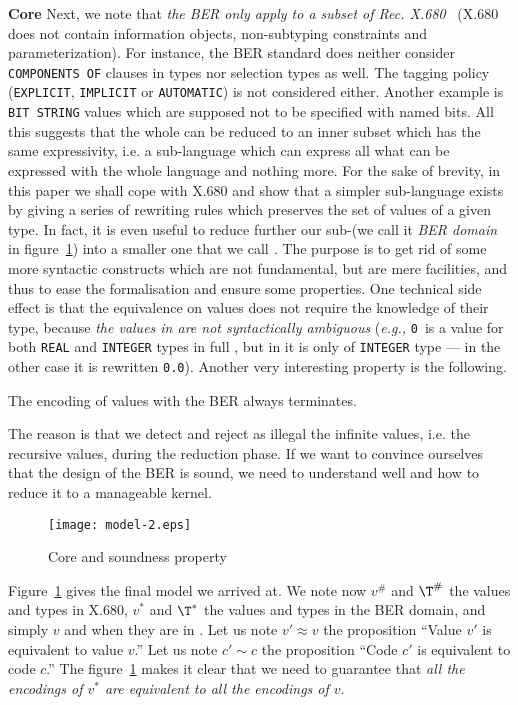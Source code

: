\textbf{Core \ASN} Next, we note that \emph{the BER only apply to a
  subset of \ITU Rec. \mbox{X.680}}~\cite{X.680:2002} (\mbox{X.680}
does not contain information objects, non-subtyping constraints and
parameterization). For instance, the BER standard does neither
consider \texttt{COMPONENTS OF} clauses in \ASN types nor selection
types as well. The tagging policy (\texttt{EXPLICIT},
\texttt{IMPLICIT} or \texttt{AUTOMA\-TIC}) is not considered
either. Another example is \texttt{BIT STRING} values which are
supposed not to be specified with named bits. All this suggests that
the whole \ASN can be reduced to an inner subset which has the same
expressivity, i.e. a sub-language which can express all what can be
expressed with the whole language and nothing more. For the sake of
brevity, in this paper we shall cope with \mbox{X.680} and show that a
simpler sub-language exists by giving a series of rewriting rules
which preserves the set of values of a given type. In fact, it is even
useful to reduce further our sub-\ASN (we call it \emph{BER domain} in
figure~\ref{model2}) into a smaller one that we call \emph{\core.} The
purpose is to get rid of some more syntactic constructs which are not
fundamental, but are mere facilities, and thus to ease the
formalisation and ensure some properties. One technical side effect is
that the equivalence on values does not require the knowledge of their
type, because \emph{the values in \core are not syntactically
  ambiguous} (\emph{e.g.,} \texttt{0}~is a value for both
\texttt{REAL} and \texttt{INTEGER} types in full \ASN, but in \core it
is only of \texttt{INTEGER} type --- in the other case it is rewritten
\texttt{0.0}). Another very interesting property is the following.

\begin{theorem}
The encoding of \core values with the BER always terminates.
\end{theorem}

The reason is that we detect and reject as illegal the infinite
values, i.e. the recursive values, during the reduction phase. If we
want to convince ourselves that the design of the BER is sound, we
need to understand well \ASN and how to reduce it to a manageable
kernel.

\begin{figure}[htbp]
  \centerline{\texttt{[image: model-2.eps]}}
  \caption{\footnotesize Core \ASN and soundness property}
  \label{model2}
\end{figure}

Figure~\ref{model2} gives the final model we arrived at. We note now
$v^{\#}$ and $\T^{\#}$ the values and types in \mbox{X.680}, $v^{*}$
and $\T^{*}$ the values and types in the BER domain, and simply $v$
and \T{} when they are in \core. Let us note $v' \approx v$ the
proposition ``Value $v'$ is equivalent to value $v$.''  Let us note
$c' \sim c$ the proposition ``Code $c'$ is equivalent to code $c$.''
The figure~\ref{model2} makes it clear that we need to guarantee that
\emph{all the encodings of $v^{*}$ are equivalent to all the encodings
of $v$}.
